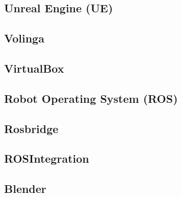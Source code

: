 \documentclass[a4paper, 12pt, spanish, twoside]{article}
\begin{document}
\subsection{Unreal Engine (UE)} \label{sec:herramientas:ue}


\subsection{Volinga} \label{sec:herramientas:volinga}


\subsection{VirtualBox} \label{sec:herramientas:virtualbox}


\subsection{Robot Operating System (ROS)} \label{sec:herramientas:ros}


\subsection{Rosbridge} 
\label{sec:herramientas:rosbridge}


\subsection{ROSIntegration} \label{sec:herramientas:rosintegration}


\subsection{Blender} \label{sec:herramientas:blender}
\end{document}
